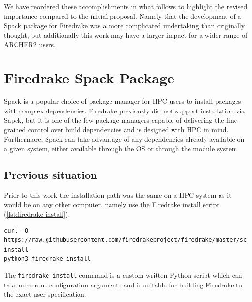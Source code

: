 \documentclass[a4paper,11pt]{article}
\begin{document}
We have reordered these accomplishments in what follows to highlight the revised importance compared to the initial proposal.
Namely that the development of a Spack package for Firedrake was a more complicated undertaking than originally thought, but additionally this work may have a larger impact for a wider range of ARCHER2 users.


\section{Firedrake Spack Package}
\label{sec:spack}
Spack\cite{spackweb,spackpaper} is a popular choice of package manager for HPC users to install packages with complex dependencies.
Firedrake previously did not support installation via Sapck, but it is one of the few package managers capable of delivering the fine grained control over build dependencies and is designed with HPC in mind.
Furthermore, Spack can take advantage of any dependencies already available on a given system, either available through the OS or through the module system.

\subsection{Previous situation}
\label{ssec:prev}
Prior to this work the installation path was the same on a HPC system as it would be on any other computer, namely use the Firedrake install script (\cref{lst:firedrake-install}).
\begin{lstlisting}[float,caption={Firedrake install script install commands},label={lst:firedrake-install}]
curl -O https://raw.githubusercontent.com/firedrakeproject/firedrake/master/scripts/firedrake-install
python3 firedrake-install
\end{lstlisting}
The \verb`firedrake-install` command is a custom written Python script which can take numerous configuration arguments and is suitable for building Firedrake to the exact user specification.
\end{document}
